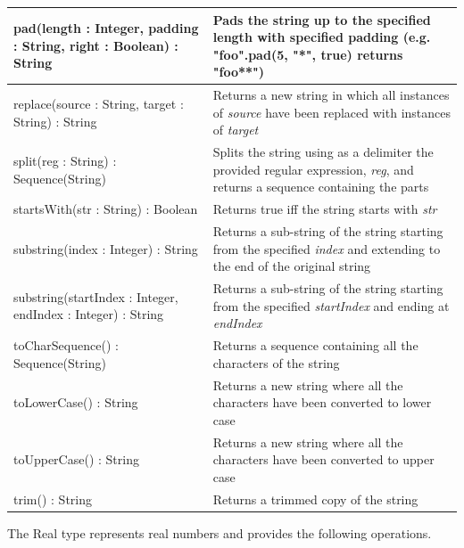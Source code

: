 \begin{longtabu} {|p{6.5cm}|X|}
    pad(length : Integer, padding : String, right : Boolean) : String & Pads the string up to the specified length with specified padding (e.g. "foo".pad(5, "*", true) returns "foo**") \\\hline
    
    replace(source : String, target : String) : String & Returns a new string in which all instances of \emph{source} have been replaced with instances of \emph{target}\\\hline
    
    split(reg : String) : Sequence(String) & Splits the string using as a delimiter the provided regular expression, \emph{reg}, and returns a sequence containing the parts\\\hline
    
    startsWith(str : String) : Boolean & Returns true iff the string starts with \emph{str}\\\hline
    
    substring(index : Integer) : String & Returns a sub-string of the string starting from the specified \emph{index} and extending to the end of the original string\\\hline
    
    substring(startIndex : Integer, endIndex : Integer) : String & Returns a sub-string of the string starting from the specified \emph{startIndex} and ending at \emph{endIndex} \\\hline
    
    toCharSequence() : Sequence(String) & Returns a sequence containing all the characters of the string\\\hline
    
    toLowerCase() : String & Returns a new string where all the characters have been converted to lower case\\\hline
    
    toUpperCase() : String & Returns a new string where all the characters have been converted to upper case\\\hline
    
    trim() : String & Returns a trimmed copy of the string \\\hline
\end{longtabu}

The Real type represents real numbers and provides the following operations.

